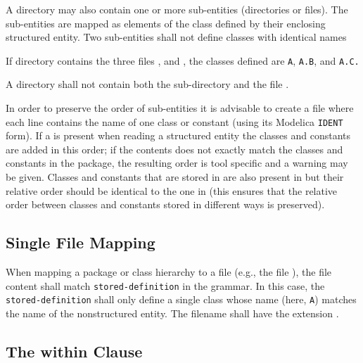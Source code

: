 A directory may also contain one or more sub-entities (directories or files).
The sub-entities are mapped as elements of the class defined by their enclosing structured entity.
Two sub-entities shall not define classes with identical names

\begin{example}
If directory  contains the three files ,  and , the classes defined are \lstinline!A!,
\lstinline!A.B!, and \lstinline!A.C.!
\end{example}

\begin{example}
A directory shall not contain both the sub-directory  and the file .
\end{example}

In order to preserve the order of sub-entities it is advisable to create a file  where each line contains the name of one class or constant (using its Modelica \lstinline!IDENT! form).
If a  is present when reading a structured entity the classes and constants are added in this order; if the contents does not exactly match the classes and constants in the package, the resulting order is tool specific and a warning may be given.
Classes and constants that are stored in  are also present in  but their relative order should be identical to the one in  (this ensures that the relative order between classes and constants stored in different ways is preserved).


\subsection{Single File Mapping}\label{mapping-a-package-class-hierarchy-into-a-single-file-nonstructured-entity}\label{single-file-mapping}

When mapping a package or class hierarchy to a file (e.g., the file ), the file content shall match \lstinline[language=grammar]!stored-definition! in the grammar.
In this case, the \lstinline[language=grammar]!stored-definition! shall only define a single class whose name (here, \lstinline!A!) matches the name of the nonstructured entity.
The filename shall have the extension .


\subsection{The within Clause}\label{the-within-clause}

